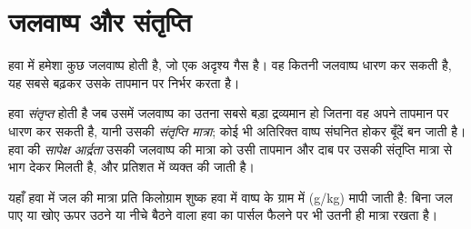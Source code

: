 \section{जलवाष्प और संतृप्ति}

हवा में हमेशा कुछ जलवाष्प होती है, जो एक अदृश्य गैस है। वह कितनी जलवाष्प धारण कर
सकती है, यह सबसे बढ़कर उसके तापमान पर निर्भर करता है।

\begin{definition}[संतृप्ति; सापेक्ष आर्द्रता]\label{def:g10:why-clouds-form:humidity}
हवा \emph{संतृप्त} होती है जब उसमें जलवाष्प का उतना सबसे बड़ा द्रव्यमान हो
जितना वह अपने तापमान पर धारण कर सकती है, यानी उसकी \emph{संतृप्ति
मात्रा}; कोई भी अतिरिक्त वाष्प संघनित होकर बूँदें बन जाती है। हवा की \emph{सापेक्ष
आर्द्रता} उसकी जलवाष्प की मात्रा को उसी तापमान और दाब पर उसकी
संतृप्ति मात्रा से भाग देकर मिलती है, और प्रतिशत में व्यक्त की जाती
है।
\end{definition}

यहाँ हवा में जल की मात्रा प्रति किलोग्राम शुष्क हवा में वाष्प के ग्राम में
(\unit{g/kg}) मापी जाती है: बिना जल पाए या खोए ऊपर उठने या नीचे बैठने वाला हवा का पार्सल
फैलने पर भी उतनी ही मात्रा रखता है।

